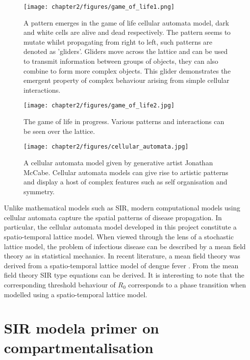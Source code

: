 \begin{figure}
    \centering
    \texttt{[image: chapter2/figures/game\_of\_life1.png]}
    \caption{A pattern emerges in the game of life cellular automata model, dark and white cells are alive and dead respectively. The pattern seems to mutate whilst propagating from right to left, such patterns are denoted as 'gliders'. Gliders move across the lattice and can be used to transmit information between groups of objects, they can also combine to form more complex objects. This glider demonstrates the emergent property of complex behaviour arising from simple cellular interactions.}
    \label{fig:my_label}
\end{figure}

\begin{figure}
    \centering
    \texttt{[image: chapter2/figures/game\_of\_life2.jpg]}
    \caption{The game of life in progress. Various patterns and interactions can be seen over the lattice.}
    \label{fig:my_label}
\end{figure}

\begin{figure}
    \centering
    \texttt{[image: chapter2/figures/cellular\_automata.jpg]}
    \caption{A cellular automata model given by generative artist Jonathan McCabe. Cellular automata models can give rise to artistic patterns and display a host of complex features such as self organisation and symmetry. }
    \label{fig:my_label}
\end{figure}

Unlike mathematical models such as SIR, modern computational models using cellular automata capture the spatial patterns of disease propagation. In particular, the cellular automata model developed in this project constitute a spatio-temporal lattice model. When viewed through the lens of a stochastic lattice model, the problem of infectious disease can be described by a mean field theory as in statistical mechanics. In recent literature, a mean field theory was derived from a spatio-temporal lattice model of dengue fever \cite{SOUZA_09,SOUZA_13}. From the mean field theory SIR type equations can be derived. It is interesting to note that the corresponding threshold behaviour of $R_0$ corresponds to a phase transition when modelled using a spatio-temporal lattice model.


\section{SIR model\textemdash a primer on compartmentalisation}
\label{sec:sir-kmc}

